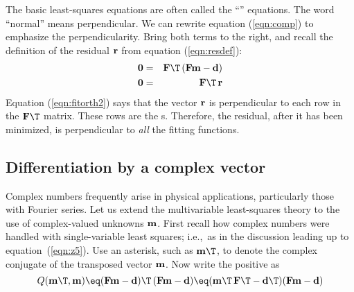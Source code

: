 \par
The basic least-squares equations are often called
the ``'' equations.
The word ``normal'' means perpendicular.
We can rewrite equation
(\ref{eqn:comp})
to emphasize the perpendicularity.
Bring both terms to the right,
and recall the definition of the residual $\bold r$
from equation (\ref{eqn:resdef}):
\begin{eqnarray}
\label{eqn:fitorth1}
\bold 0  &=& \bold F\T\,( \bold F   \bold m - \dd)  \\
\bold 0  &=& \bold F\T\,\bold r 
\label{eqn:fitorth2}
\end{eqnarray}
Equation (\ref{eqn:fitorth2}) says that the  vector $\bold r$
is perpendicular to
each row in the $\bold F\T$ matrix.
These rows are the s.
Therefore, the residual, after it has been minimized,
is perpendicular to
{\it all}
the fitting functions.

\subsection{Differentiation by a complex vector}

\par
Complex numbers frequently arise in physical applications,
particularly those with Fourier series.
Let us extend the multivariable least-squares theory
to the use of complex-valued unknowns $\bold m$.
First recall how complex numbers were handled
with single-variable least squares;
i.e.,~as in the discussion leading up to equation~(\ref{eqn:z5}).
Use an asterisk, such as $\bold m\T$, to denote the complex conjugate
of the transposed vector $\bold m$.
Now write the positive  as
\begin{equation}
Q(\bold m\T, \bold m) \eq
(\bold F\bold m - \bold d)\T\,
(\bold F\bold m - \bold d)
\eq
(\bold m\T\,\bold F\T - \bold d\T)
(\bold F\bold m - \bold d)
\label{eqn:6-1-23}
\end{equation}

